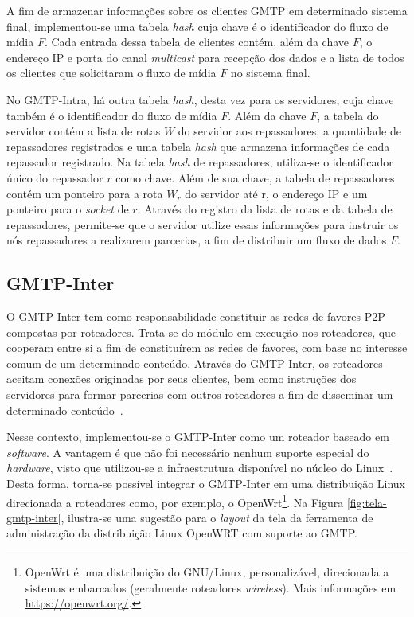 A fim de armazenar informações sobre os clientes GMTP em determinado sistema final, implementou-se uma tabela \textit{hash} cuja chave é o identificador do fluxo de mídia $F$. 
Cada entrada dessa tabela de clientes contém, além da chave $F$, o endereço IP e porta do canal \textit{multicast} para recepção dos dados e a lista de todos os clientes que solicitaram o fluxo de mídia $F$ no sistema final.

No GMTP-Intra, há outra tabela \textit{hash}, desta vez para os servidores, cuja chave também é o identificador do fluxo de mídia $F$.
Além da chave $F$, a tabela do servidor contém a lista de rotas $W$ do servidor aos repassadores, a quantidade de repassadores registrados e uma tabela \textit{hash} que armazena informações de cada repassador registrado.
Na tabela \textit{hash} de repassadores, utiliza-se o identificador único do repassador $r$ como chave.
Além de sua chave, a tabela de repassadores contém um ponteiro para a rota $W_r$ do servidor até r, o endereço IP e um ponteiro para o \textit{socket} de $r$.
Através do registro da lista de rotas e da tabela de repassadores, permite-se que o servidor utilize essas informações para instruir os nós repassadores a realizarem parcerias, a fim de distribuir um fluxo de dados $F$.

% 
% 
% 
%
\subsection{GMTP-Inter}
\label{sec:inter}

O GMTP-Inter tem como responsabilidade constituir as redes de favores P2P compostas por roteadores.
Trata-se do módulo em execução nos roteadores, que cooperam entre si a fim de constituírem as redes de
favores, com base no interesse comum de um determinado conteúdo. 
Através do GMTP-Inter, os roteadores aceitam conexões originadas por seus clientes, bem como instruções dos servidores para formar parcerias com outros roteadores a fim de disseminar um determinado conteúdo~\cite{sales2014gmtp}. 

Nesse contexto, implementou-se o GMTP-Inter como um roteador baseado em \textit{software}. A vantagem é que não foi necessário nenhum suporte especial do \textit{hardware}, visto que utilizou-se a infraestrutura disponível no núcleo do Linux~\cite{dukkipati2007rate}.
Desta forma, torna-se possível integrar o GMTP-Inter em uma distribuição Linux direcionada a roteadores como, por exemplo, o OpenWrt\footnote{OpenWrt é uma distribuição do GNU/Linux, personalizável, direcionada a sistemas embarcados (geralmente roteadores \textit{wireless}). Mais informações em \url{https://openwrt.org/}.}.
Na Figura \ref{fig:tela-gmtp-inter}, ilustra-se uma sugestão para o \textit{layout} da tela da ferramenta de administração da distribuição Linux OpenWRT com suporte ao GMTP.

